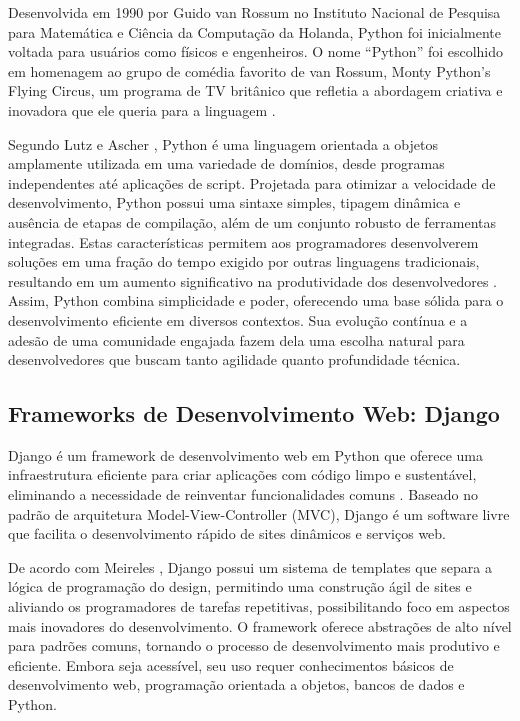 Desenvolvida em 1990 por Guido van Rossum no Instituto Nacional de Pesquisa para Matemática e Ciência da Computação da Holanda, Python foi inicialmente voltada para usuários como físicos e engenheiros. O nome ``Python'' foi escolhido em homenagem ao grupo de comédia favorito de van Rossum, Monty Python's Flying Circus, um programa de TV britânico que refletia a abordagem criativa e inovadora que ele queria para a linguagem \cite{meireles2010}.

Segundo Lutz e Ascher \cite{lutz2007}, Python é uma linguagem orientada a objetos amplamente utilizada em uma variedade de domínios, desde programas independentes até aplicações de script. Projetada para otimizar a velocidade de desenvolvimento, Python possui uma sintaxe simples, tipagem dinâmica e ausência de etapas de compilação, além de um conjunto robusto de ferramentas integradas. Estas características permitem aos programadores desenvolverem soluções em uma fração do tempo exigido por outras linguagens tradicionais, resultando em um aumento significativo na produtividade dos desenvolvedores \cite{lutz2007}. Assim, Python combina simplicidade e poder, oferecendo uma base sólida para o desenvolvimento eficiente em diversos contextos. Sua evolução contínua e a adesão de uma comunidade engajada fazem dela uma escolha natural para desenvolvedores que buscam tanto agilidade quanto profundidade técnica.

\subsection{Frameworks de Desenvolvimento Web: Django}
Django é um framework de desenvolvimento web em Python que oferece uma infraestrutura eficiente para criar aplicações com código limpo e sustentável, eliminando a necessidade de reinventar funcionalidades comuns \cite{meireles2010}. Baseado no padrão de arquitetura Model-View-Controller (MVC), Django é um software livre que facilita o desenvolvimento rápido de sites dinâmicos e serviços web.

De acordo com Meireles \cite{meireles2010}, Django possui um sistema de templates que separa a lógica de programação do design, permitindo uma construção ágil de sites e aliviando os programadores de tarefas repetitivas, possibilitando foco em aspectos mais inovadores do desenvolvimento. O framework oferece abstrações de alto nível para padrões comuns, tornando o processo de desenvolvimento mais produtivo e eficiente. Embora seja acessível, seu uso requer conhecimentos básicos de desenvolvimento web, programação orientada a objetos, bancos de dados e Python.

